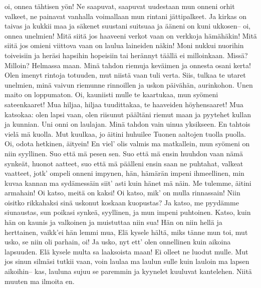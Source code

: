     oi, onnea tähtisen yön!
  \endverse
  \beginverse
    Ne saapuvat, saapuvat uudestaan
    mun onneni orhit valkeet,
    ne painavat vanhalla voimallaan
    mun rintani jättipalkeet.
    Ja kirkas on taivas ja kukkii maa
    ja säkenet suustani suitsuaa
    ja ääneni on kuni ukkosen--
    oi, onnea unelmien!
  \endverse
  \beginverse
    Mitä siitä jos haaveeni verkot vaan
    on verkkoja hämähäkin!
    Mitä siitä jos omieni viittova vaan
    on laulua laineiden näkin!
    Moni nukkui nuorihin toiveisiin
    ja heräsi hapsihin hopeisiin
    tai herännyt täällä ei milloinkaan.
    Missä? Milloin? Helmassa maan.
    Minä tahdon riemuja keväimen
    ja onnesta osani kerta!
    Olen imenyt rintoja totuuden,
    mut niistä vaan tuli verta.
    Siis, tulkaa te utaret unelmien,
    minä vaivun riemunne rinnoillen
    ja uskon päivähän, aurinkohon.
    Unen maito on loppumaton.
  \endverse
  \beginverse
    Oi, kauniisti mulle te kaartukaa,
    mun syömeni sateenkaaret!
    Mua hiljaa, hiljaa tuudittakaa,
    te haaveiden höyhensaaret!
    Mua katsokaa: olen lapsi vaan,
    olen riisunut päältäni riemut maan
    ja pyytehet kullan ja kunnian.
    Uni onni on laulajan.
  \endverse
  \beginverse
    Minä tahdon vain uinua yksikseen.
    En tahtois vielä mä kuolla.
    Mut kuulkaa, jo äitini huhuilee
    Tuonen aaltojen tuolla puolla.
    Oi, odota hetkinen, äityein!
    En viel' olis valmis ma matkallein,
    mun syömeni on niin syyllinen.
    Suo että mä pesen sen.
  \endverse
  \beginverse
    Suo että mä ensin huuhdon vaan
    nämä synkeät, huonot aatteet,
    suo että mä päälleni ensin saan
    ne puhtahat, valkeat vaatteet,
    jotk' ompeli onneni impynen,
    hän, hämärän impeni ihmeellinen,
    min kuvaa kannan ma sydämessäin
    siit' asti kuin hänet mä näin.
  \endverse
  \beginverse
    Me tulemme, äitini armahain!
    Oi katso, meitä on kaksi!
    Oi katso, mik' on mulla rinnassain!
    Niin oisitko rikkahaksi
    sinä uskonut koskaan kuopustas?
    Ja katso, me pyydämme siunaustas,
    sun poikasi synkeä, syyllinen,
    ja mun impeni puhtoinen.
  \endverse
  \beginverse
    Katso, kuin hän on kaunis ja valkoinen
    ja muistuttaa niin sua!
    Hän on niin hellä ja herttainen,
    vaikk'ei hän lemmi mua,
    Elä kysele hältä, miks tänne mun toi,
    mut usko, se niin oli parhain, oi!
    Ja usko, nyt ett' olen onnellinen
    kuin aikoina lapsuuden.
  \endverse
  \beginverse
    Elä kysele multa sa laaksoista maan!
    Ei olleet ne luodut mulle.
    Mut jos sinun silmäsi tutkii vaan,
    voin laulaa ma laulun sulle
    kuin lauloin ma lapsen aikoihin--
    kas, lauluna sujuu se paremmin
    ja kyynelet kuuluvat kantelehen.
    Niitä muuten ma ilmoita en.
  \endverse
\endsong


